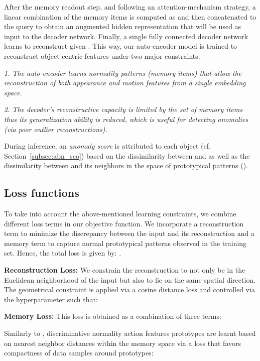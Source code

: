 \documentclass{article}
\begin{document}
 

After the memory readout step, and following an attention-mechanism strategy, a linear combination of the memory items is computed as   and then concatenated to the query  to obtain an augmented hidden representation  that will be used as input to the decoder network. Finally, a single fully connected decoder network learns to reconstruct  given . 
This way, our auto-encoder model is trained to reconstruct object-centric features  under two major constraints:

\textit{1. The auto-encoder learns normality patterns (memory items) that allow the reconstruction of both appearance and motion features from a single embedding space.}

\textit{2. The decoder's reconstructive capacity is limited by the set of memory items thus its generalization ability is reduced, which is useful for detecting anomalies (via poor outlier reconstructions). }

During inference, an \emph{anomaly score} is attributed to each object (cf. Section~\ref{subsec:abn_sco}) based on the dissimilarity between  and  as well as the dissimilarity between  and its neighbors in the space of prototypical patterns (). 


\subsection{Loss functions}

To take into account the above-mentioned learning constraints, we combine different loss terms in our objective function. We incorporate a reconstruction term  to minimize the discrepancy between the input  and its reconstruction and a memory term  to capture normal prototypical patterns observed in the training set.  Hence, the total loss is given by:
.


\textbf{Reconstruction Loss: } We constrain the reconstruction to not only be in the Euclidean neighborhood of the input but also to lie on the same spatial direction. The geometrical constraint is applied via a cosine distance loss and controlled via the hyperparameter  such that:




\textbf{Memory Loss:} This loss is obtained as a combination of three terms:



Similarly to \cite{mnad}, discriminative normality action features prototypes are learnt based on nearest neighbor distances within the memory space via a loss that favors compactness of data samples around prototypes: 
\end{document}
